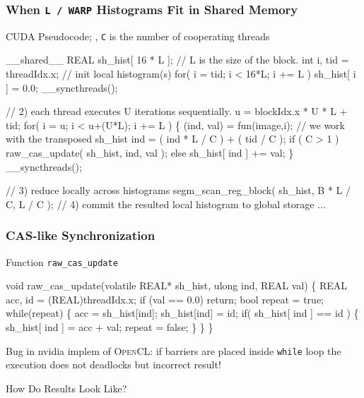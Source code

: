 \documentclass{beamer}
\renewcommand{\emph}[1]{\textcolor{structure}{#1}}
\newcommand{\emp}[1]{\textcolor{DikuRed}{ #1}}
\newcommand{\emphh}[1]{\textcolor{CosGreen}{ #1}}
\begin{document}
\begin{frame}[fragile,t]
  \frametitle{ When {\tt L / WARP} Histograms Fit in Shared Memory }

\begin{block}{ CUDA Pseudocode; {\tt }, {\tt C} is the number of cooperating threads}
\begin{colorcode}[fontsize=\scriptsize]
\emph{__shared__ REAL sh_hist[ 16 * L ];} // L is the size of the block.
int i, tid = threadIdx.x; 
// \emp{init local histogram(s)}
for( i = tid; i < 16*L; i += L ) sh_hist[ i ] = 0.0;  
__syncthreads();

// \emp{2) each thread executes U iterations sequentially.}
u = blockIdx.x * U * L + tid; 
for( i = u; i < u+(U*L); i += L ) \{
    (ind, val) = fun(image,i);
    \emphh{// we work with the transposed sh_hist}
    \emphh{ind = ( ind * L / C ) + ( tid / C );}  
    if ( C > 1 )
         \emph{raw_cas_update( sh_hist, ind, val );}
    else \emph{sh_hist[ ind ] += val;}
\}  __syncthreads();

// \emp{3) reduce locally across histograms}
\emphh{segm_scan_reg_block( sh_hist, B * L / C, L / C );}
// \emp{4) commit the resulted local histogram to global storage } ...
\end{colorcode}
\end{block} 
\end{frame}


\begin{frame}[fragile,t]
  \frametitle{ CAS-like Synchronization }

\begin{block}{ Function {\tt raw\_cas\_update} }
\begin{colorcode}[fontsize=\scriptsize]
void raw_cas_update(volatile REAL* sh_hist, ulong ind, REAL val) \{
    REAL acc, id  = (REAL)threadIdx.x;
    if (val == 0.0) return;
    bool repeat = true;
    while(repeat) \{
        acc = sh_hist[ind];
        \emp{sh_hist[ind] = id;} 
        \emp{if( sh_hist[ ind ] == id )} \{
            \emph{sh_hist[ ind ] = acc + val;}
            repeat = false;
        \}
    \}
\}
\end{colorcode}
\end{block} 

\bigskip

Bug in {\sc nvidia} implem of \textsc{OpenCL}: 
if barriers are placed inside {\tt while} loop the
execution does not deadlocks but incorrect result!\bigskip

\alert{How Do Results Look Like?}

\end{frame}
\end{document}
